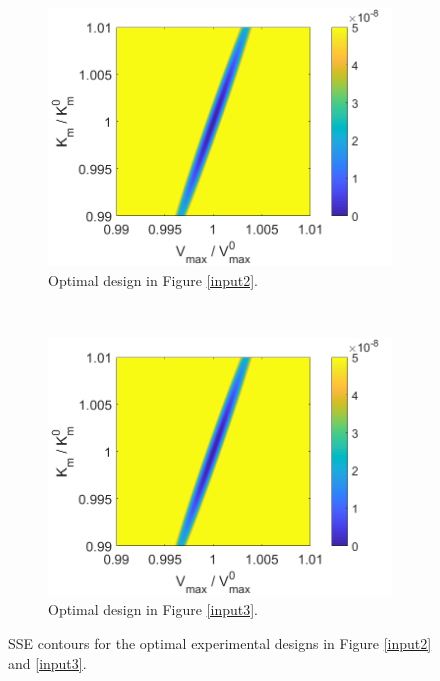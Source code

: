 \begin{figure}
	\centering
	\begin{subfigure}[b]{0.45\textwidth}
		\includegraphics[width=\textwidth]{figure/paper 1/compare5.png}
		\caption{Optimal design in Figure \ref{input2}.}
		\label{SSEopt2}
	\end{subfigure}
	~ %
	\begin{subfigure}[b]{0.45\textwidth}
		\includegraphics[width=\textwidth]{figure/paper 1/compare6.png}
		\caption{Optimal design in Figure \ref{input3}.}
		\label{SSEopt3}
	\end{subfigure}
	\caption{SSE contours for the optimal experimental designs in Figure \ref{input2} and \ref{input3}.}
	\label{figCompare5}
\end{figure}
